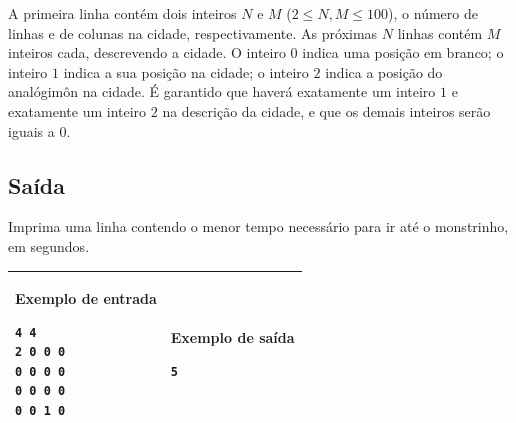 A primeira linha contém dois inteiros $N$ e $M$ ($2 \leq N, M \leq 100$), o
número de linhas e de colunas na cidade, respectivamente. As próximas $N$ linhas
contém $M$ inteiros cada, descrevendo a cidade. O inteiro $0$ indica uma posição
em branco; o inteiro $1$ indica a sua posição na cidade; o inteiro $2$ indica a
posição do analógimôn na cidade.
É garantido que haverá exatamente um inteiro
$1$ e exatamente um inteiro $2$ na descrição da cidade, e que os demais inteiros
serão iguais a $0$.

\subsection*{Saída}

Imprima uma linha contendo o menor tempo necessário para ir até o
monstrinho, em segundos.

\begin{table}[!h]
\centering
\begin{tabular}{|l|l|}
\hline
\begin{minipage}[t]{3in}
\textbf{Exemplo de entrada}
\begin{verbatim}
4 4
2 0 0 0
0 0 0 0
0 0 0 0
0 0 1 0
\end{verbatim}
\vspace{1mm}
\end{minipage}
&

\begin{minipage}[t]{3in}
\textbf{Exemplo de saída}
\begin{verbatim}
5
\end{verbatim}
\vspace{1mm}
\end{minipage} \\
\hline
\end{tabular}
\end{table}
